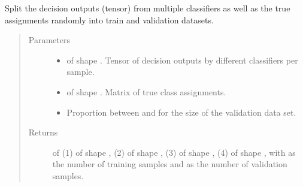 \documentclass[letterpaper,10pt,english]{sphinxmanual}
\begin{document}
\begin{fulllineitems}
\label{\detokenize{pusion.util.generator:pusion.util.generator.split_into_train_and_validation_data}}
\sphinxAtStartPar
Split the decision outputs (tensor) from multiple classifiers as well as the true assignments randomly into train
and validation datasets.
\begin{quote}\begin{description}
\item[{Parameters}] \leavevmode\begin{itemize}
\item {} 
\sphinxAtStartPar
{} \textendash{}  of shape .
Tensor of decision outputs by different classifiers per sample.

\item {} 
\sphinxAtStartPar
{} \textendash{}  of shape .
Matrix of true class assignments.

\item {} 
\sphinxAtStartPar
{} \textendash{} Proportion between  and  for the size of the validation data set.

\end{itemize}

\item[{Returns}] \leavevmode
\sphinxAtStartPar
{} of
(1)  of shape ,
(2)  of shape ,
(3)  of shape ,
(4)  of shape , with  as the number of training
samples and  as the number of validation samples.

\end{description}\end{quote}

\end{fulllineitems}
\end{document}
